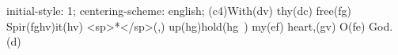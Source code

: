 initial-style: 1;
centering-scheme: english;
(c4)With(dv) thy(dc) free(fg) Spir(fghv)it(hv) <sp>*</sp>(,) up(hg)hold(hg~) my(ef) heart,(gv) O(fe) God.(d)
